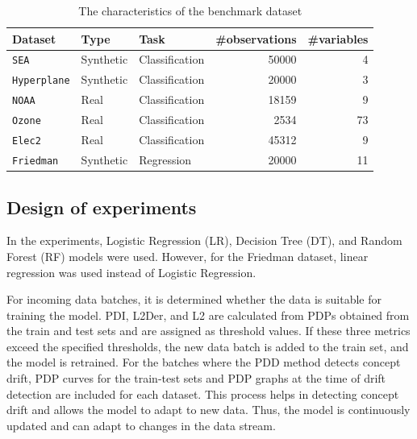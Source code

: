 \documentclass[pdflatex,sn-mathphys-ay]{sn-jnl}%
\theoremstyle{thmstyleone}%
\theoremstyle{thmstyletwo}%
\theoremstyle{thmstylethree}%
\begin{document}
\begin{table}[h]
    \centering
    \scriptsize
    \caption{The characteristics of the benchmark dataset}
    \label{tab:dataset}
    \begin{tabular}{lllrr}\toprule
    \textbf{Dataset}        & \textbf{Type} & \textbf{Task}     & \textbf{\#observations}   & \textbf{\#variables} \\\midrule
    \texttt{SEA}            & Synthetic     & Classification    & 50000            & 4\\
    \texttt{Hyperplane}     & Synthetic     & Classification    & 20000            & 3\\
    \texttt{NOAA}           & Real          & Classification    & 18159            & 9\\
    \texttt{Ozone}          & Real          & Classification    & 2534             & 73\\
    \texttt{Elec2}          & Real          & Classification    & 45312            & 9\\
    \texttt{Friedman}       & Synthetic     & Regression        & 20000            & 11\\\bottomrule
    \end{tabular}
\end{table}

\subsection{Design of experiments}

In the experiments, Logistic Regression (LR), Decision Tree (DT), and Random Forest (RF) models were used. However, for the Friedman dataset, linear regression was used instead of Logistic Regression.

For incoming data batches, it is determined whether the data is suitable for training the model. PDI, L2Der, and L2 are calculated from PDPs obtained from the train and test sets and are assigned as threshold values. If these three metrics exceed the specified thresholds, the new data batch is added to the train set, and the model is retrained. For the batches where the PDD method detects concept drift, PDP curves for the train-test sets and PDP graphs at the time of drift detection are included for each dataset. This process helps in detecting concept drift and allows the model to adapt to new data. Thus, the model is continuously updated and can adapt to changes in the data stream. 
\end{document}

